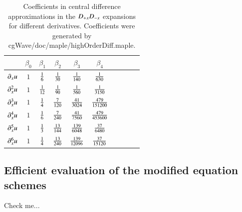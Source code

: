 {
  \renewcommand{\arraystretch}{2.5}
  \everymath{\displaystyle}
\begin{table}[H]\tableFont %
\begin{center}
\begin{tabular}{|l|c|c|c|c|c|c|c|c|c|} \hline 
            &  $\beta_0$  & $\beta_1$     & $\beta_2$    & $\beta_3$    & $\beta_4$    \\ \hline
 $\partial_x u$   &  $1$        &  $\frac{1}{6}$    & $\frac{1}{30}$    &  $\frac{1}{140}$   & $\frac{1}{630}$    \\ \hline
 $\partial_x^2 u$ &  $1$        &  $\frac{1}{12}$    & $\frac{1}{90}$    &  $\frac{1}{560}$   & $\frac{1}{3150}$    \\ \hline
 $\partial_x^3 u$ &  $1$        &  $\frac{1}{4}$    & $\frac{7}{120}$    &  $\frac{41}{3024}$   & $\frac{479}{151200}$    \\ \hline
 $\partial_x^4 u$ &  $1$        &  $\frac{1}{6}$    & $\frac{7}{240}$    &  $\frac{41}{7560}$   & $\frac{479}{453600}$    \\ \hline
 $\partial_x^5 u$ &  $1$        &  $\frac{1}{3}$    & $\frac{13}{144}$    &  $\frac{139}{6048}$   & $\frac{37}{6480}$    \\ \hline
 $\partial_x^6 u$ &  $1$        &  $\frac{1}{4}$    & $\frac{13}{240}$    &  $\frac{139}{12096}$   & $\frac{37}{15120}$    \\ \hline
\end{tabular}
\caption{Coefficients in central difference approximations in the $D_{+x}D_{-x}$ expansions for different derivatives.
    Coefficients were generated by cgWave/doc/maple/highOrderDiff.maple.}
\label{tab:coeffInDpDmExpansions}
\end{center}
\end{table}
}


\subsection{Efficient evaluation of the modified equation schemes}

\mni
{\red Check me...}

